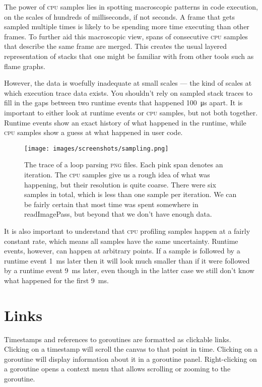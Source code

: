 \documentclass[10pt,letterpaper,oneside,openany,english]{memoir}
\newcommand{\code}[1]{{\ttfamily\mbox{#1}}}
\begin{document}
The power of \textsc{cpu} samples lies in spotting macroscopic patterns in code execution, on the scales of hundreds of milliseconds, if not seconds.
A frame that gets sampled multiple times is likely to be spending more time executing than other frames.
To further aid this macroscopic view, spans of consecutive \textsc{cpu} samples that describe the same frame are merged.
This creates the usual layered representation of stacks that one might be familiar with from other tools such as flame graphs.

However, the data is woefully inadequate at small scales --- the kind of scales at which execution trace data exists.
You shouldn't rely on sampled stack traces to fill in the gaps between two runtime events that happened \qty{100}{\micro\second} apart.
It is important to either look at runtime events or \textsc{cpu} samples, but not both together.
Runtime events show an exact history of what happened in the runtime, while \textsc{cpu} samples show a guess at what happened in user code.

\begin{figure}[h]
\texttt{[image: images/screenshots/sampling.png]}
\caption{
  The trace of a loop parsing \textsc{png} files.
  Each pink span denotes an iteration.
  The \textsc{cpu} samples give us a rough idea of what was happening, but their resolution is quite coarse.
  There were six samples in total, which is less than one sample per iteration.
  We can be fairly certain that most time was spent somewhere in \code{readImagePass}, but beyond that we don't have enough data.
}
\end{figure}

It is also important to understand that \textsc{cpu} profiling samples happen at a fairly constant rate, which means all samples have the same uncertainty.
Runtime events, however, can happen at arbitrary points.
If a sample is followed by a runtime event \qty{1}{\milli\second} later then it will look much smaller than if it were followed by a runtime event \qty{9}{\milli\second} later,
even though in the latter case we still don't know what happened for the first \qty{9}{\milli\second}. 

\section{Links}

Timestamps and references to goroutines are formatted as clickable links.
Clicking on a timestamp will scroll the canvas to that point in time.
Clicking on a goroutine will display information about it in a goroutine panel.
Right-clicking on a goroutine opens a context menu that allows scrolling or zooming to the goroutine.
\end{document}
